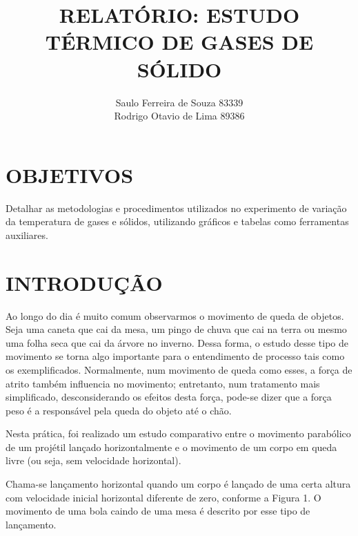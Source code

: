 \documentclass[10pt]{article}
\begin{document}
	

\title{\uppercase{\textbf{Relatório: Estudo térmico de gases de sólido}}}
\author{Saulo Ferreira de Souza 83339 \protect\\ Rodrigo Otavio de Lima 89386}
\maketitle

\setlength{\parindent}{2cm}

\section{OBJETIVOS}

Detalhar as metodologias e procedimentos utilizados no experimento de variação da temperatura de gases e sólidos, utilizando gráficos e tabelas como ferramentas auxiliares.

\section{INTRODUÇÃO}

Ao longo do dia é muito comum observarmos o movimento de queda de objetos. Seja uma caneta que cai da mesa, um pingo de chuva que cai na terra ou mesmo uma folha seca que cai da árvore no inverno. Dessa forma, o estudo desse tipo de movimento se torna algo importante para o  entendimento  de  processo tais  como os  exemplificados.  Normalmente,  num  movimento  de queda  como  esses,  a  força  de  atrito  também  influencia  no  movimento;  entretanto,  num  tratamento mais simplificado, desconsiderando os efeitos desta força, pode-se dizer que a força peso é a responsável pela queda do objeto até o chão. 

Nesta prática, foi realizado um estudo comparativo entre o movimento parabólico de um projétil lançado  horizontalmente  e o movimento de  um corpo em queda livre  (ou seja, sem velocidade horizontal).

Chama-se lançamento horizontal quando um corpo é lançado de uma certa altura com velocidade inicial horizontal diferente de  zero, conforme  a  Figura 1. O  movimento de  uma  bola  caindo de 
uma mesa é descrito por esse tipo de lançamento.
\end{document}
